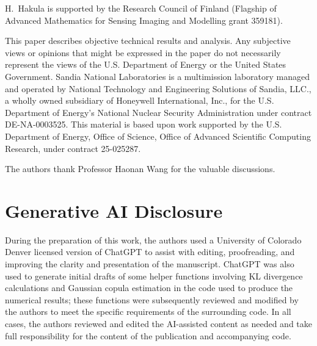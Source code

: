\documentclass{article}
\begin{document}
H.~Hakula is supported by the Research Council of Finland (Flagship of Advanced Mathematics for Sensing Imaging and Modelling grant 359181).

This paper describes objective technical results and analysis. Any subjective views or opinions that might be expressed in the paper do not necessarily represent the views of the U.S. Department of Energy or the United States Government.
Sandia National Laboratories is a multimission laboratory managed and operated by National Technology and
Engineering Solutions of Sandia, LLC., a wholly owned subsidiary of Honeywell International, Inc.,
for the U.S. Department of Energy’s National Nuclear Security Administration under contract DE-NA-0003525.  This material is based upon work supported by the U.S. Department of Energy, Office of Science, Office of Advanced Scientific Computing Research, under contract 25-025287.

The authors thank Professor Haonan Wang for the valuable discussions.

\section{Generative AI Disclosure}

During the preparation of this work, the authors used a University of Colorado Denver licensed version of ChatGPT to assist with editing, proofreading, and improving the clarity and presentation of the manuscript. ChatGPT was also used to generate initial drafts of some helper functions involving KL divergence calculations and Gaussian copula estimation in the code used to produce the numerical results; these functions were subsequently reviewed and modified by the authors to meet the specific requirements of the surrounding code. In all cases, the authors reviewed and edited the AI-assisted content as needed and take full responsibility for the content of the publication and accompanying code.



\end{document}
